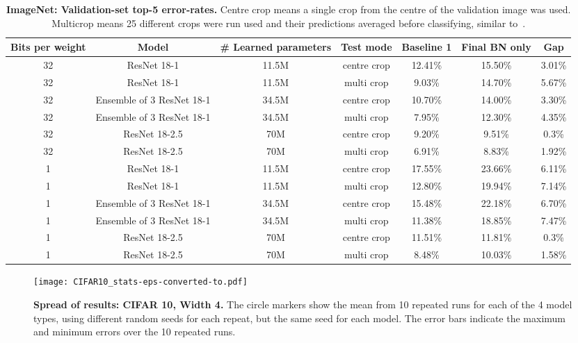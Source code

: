 \documentclass[conference]{IEEEtran}
\begin{document}
\begin{table*}[h]
\caption{{\bf ImageNet: Validation-set top-5 error-rates.} Centre crop means a single  crop from the centre of the validation image was used. Multicrop means 25 different crops were run used and their predictions averaged before classifying, similar to~\cite{He.16}.}\label{Table02}
\begin{center}
\footnotesize
\begin{tabular}{|c|c|c|c|c|c|c|}
\hline
{\bf Bits per weight} &{\bf Model} &{\bf \# Learned parameters} & {\bf Test mode} &  {\bf Baseline 1}  & {\bf Final BN only} &{\bf  Gap}\\
\hline
32& ResNet 18-1&11.5M& centre crop & 12.41\% & 15.50\% & 3.01\%\\
\hline
32& ResNet 18-1&11.5M& multi crop &  9.03\% & 14.70\% & 5.67\%\\
\hline
32& Ensemble of 3 ResNet 18-1&34.5M &centre crop & 10.70\% & 14.00\% & 3.30\%\\
\hline
32& Ensemble of 3 ResNet 18-1&34.5M& multi crop & 7.95\% & 12.30\% & 4.35\%\\
\hline
32& ResNet 18-2.5 &70M& centre crop & {{9.20\%}} & 9.51\% & 0.3\%\\
\hline
32& ResNet 18-2.5 &70M& multi crop &  {{6.91\%}} & 8.83\%& 1.92\%\\
\hline
\hline
1& ResNet 18-1&11.5M& centre crop & 17.55\%&23.66\% &6.11\%\\
\hline
1&ResNet 18-1&11.5M& multi crop &12.80\% &19.94\%&7.14\%\\
\hline
1&Ensemble of 3 ResNet 18-1&34.5M &centre crop &15.48\% &22.18\% &6.70\%\\
\hline
1&Ensemble of 3 ResNet 18-1&34.5M& multi crop &11.38\% &18.85\%&7.47\%\\
\hline
1&ResNet 18-2.5&70M& centre crop & {{11.51\%}}  & 11.81\%&0.3\% \\
\hline
1&ResNet 18-2.5 &70M&  multi crop &  {{8.48\%}}  &10.03\% &1.58\% \\
\hline
\end{tabular}
\end{center}
\end{table*}


\begin{figure}[h]
\begin{center}
{\texttt{[image: CIFAR10\_stats-eps-converted-to.pdf]}}
\end{center}
\caption{{\bf  Spread of results: CIFAR 10, Width 4.} The circle markers show the mean from 10 repeated runs for each of the 4 model types, using different random seeds for each repeat, but the same seed for each model. The error bars indicate the maximum and minimum errors over the 10 repeated runs.}\label{fig:res1}
\end{figure}
\end{document}

